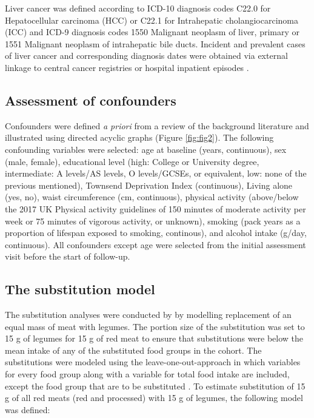 \documentclass[nutrients,article,submit,moreauthors,pdftex]{Definitions/mdpi}
\begin{document}
Liver cancer was defined according to ICD-10 diagnosis codes C22.0 for
Hepatocellular carcinoma (HCC) or C22.1 for Intrahepatic
cholangiocarcinoma (ICC) and ICD-9 diagnosis codes 1550 Malignant
neoplasm of liver, primary or 1551 Malignant neoplasm of intrahepatic
bile ducts. Incident and prevalent cases of liver cancer and
corresponding diagnosis dates were obtained via external linkage to
central cancer registries or hospital inpatient episodes
\citep{RN112, RN114}.

\hypertarget{subsec4}{%
\subsection{Assessment of confounders}\label{subsec4}}

Confounders were defined \emph{a priori} from a review of the background
literature and illustrated using directed acyclic graphs (Figure
\ref{fig:fig2}). The following confounding variables were selected: age
at baseline (years, continuous), sex (male, female), educational level
(high: College or University degree, intermediate: A levels/AS levels, O
levels/GCSEs, or equivalent, low: none of the previous mentioned),
Townsend Deprivation Index (continuous), Living alone (yes, no), waist
circumference (cm, continuous), physical activity (above/below the 2017
UK Physical activity guidelines of 150 minutes of moderate activity per
week or 75 minutes of vigorous activity, or unknown), smoking (pack
years as a proportion of lifespan exposed to smoking, continous), and
alcohol intake (g/day, continuous). All confounders except age were
selected from the initial assessment visit before the start of
follow-up.

\hypertarget{subsec5}{%
\subsection{The substitution model}\label{subsec5}}

The substitution analyses were conducted by by modelling replacement of
an equal mass of meat with legumes. The portion size of the substitution
was set to 15 g of legumes for 15 g of red meat to ensure that
substitutions were below the mean intake of any of the substituted food
groups in the cohort. The substitutions were modeled using the
leave-one-out-approach in which variables for every food group along
with a variable for total food intake are included, except the food
group that are to be substituted \citep{Ibsen2021}. To estimate
substitution of 15 g of all red meats (red and processed) with 15 g of
legumes, the following model was defined:
\end{document}
